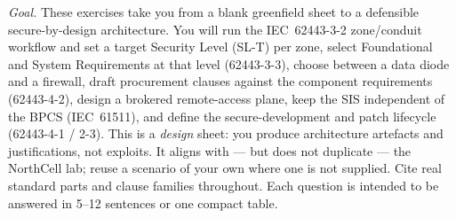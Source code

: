 \documentclass[11pt,a4paper]{article}
\begin{document}
\sheetheader

\noindent\emph{Goal.} These exercises take you from a blank greenfield sheet to a defensible secure-by-design architecture. You will run the IEC~62443-3-2 zone/conduit workflow and set a target Security Level (SL-T) per zone, select Foundational and System Requirements at that level (62443-3-3), choose between a data diode and a firewall, draft procurement clauses against the component requirements (62443-4-2), design a brokered remote-access plane, keep the SIS independent of the BPCS (IEC~61511), and define the secure-development and patch lifecycle (62443-4-1 / 2-3). This is a \emph{design} sheet: you produce architecture artefacts and justifications, not exploits. It aligns with --- but does not duplicate --- the NorthCell lab; reuse a scenario of your own where one is not supplied. Cite real standard parts and clause families throughout. Each question is intended to be answered in 5--12 sentences or one compact table.
\end{document}
